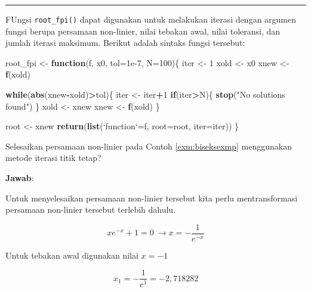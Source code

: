 \documentclass[]{book}
\newenvironment{Shaded}{\begin{snugshade}}{\end{snugshade}}
\newcommand{\ControlFlowTok}[1]{\textcolor[rgb]{0.13,0.29,0.53}{\textbf{#1}}}
\newcommand{\DataTypeTok}[1]{\textcolor[rgb]{0.13,0.29,0.53}{#1}}
\newcommand{\DecValTok}[1]{\textcolor[rgb]{0.00,0.00,0.81}{#1}}
\newcommand{\FloatTok}[1]{\textcolor[rgb]{0.00,0.00,0.81}{#1}}
\newcommand{\KeywordTok}[1]{\textcolor[rgb]{0.13,0.29,0.53}{\textbf{#1}}}
\newcommand{\NormalTok}[1]{#1}
\newcommand{\OperatorTok}[1]{\textcolor[rgb]{0.81,0.36,0.00}{\textbf{#1}}}
\newcommand{\StringTok}[1]{\textcolor[rgb]{0.31,0.60,0.02}{#1}}
\theoremstyle{definition}
\theoremstyle{definition}
\theoremstyle{definition}
\theoremstyle{remark}
\let\BeginKnitrBlock\begin \let\EndKnitrBlock\end
\begin{document}
\begin{center}\rule{0.5\linewidth}{\linethickness}\end{center}

FUngsi \texttt{root\_fpi()} dapat digunakan untuk melakukan iterasi dengan argumen fungsi berupa persamaan non-linier, nilai tebakan awal, nilai toleransi, dan jumlah iterasi maksimum. Berikut adalah sintaks fungsi tersebut:

\begin{Shaded}
\begin{Highlighting}[]
\NormalTok{root_fpi <-}\StringTok{ }\ControlFlowTok{function}\NormalTok{(f, x0, }\DataTypeTok{tol=}\FloatTok{1e-7}\NormalTok{, }\DataTypeTok{N=}\DecValTok{100}\NormalTok{)\{}
\NormalTok{  iter <-}\StringTok{ }\DecValTok{1}
\NormalTok{  xold <-}\StringTok{ }\NormalTok{x0}
\NormalTok{  xnew <-}\StringTok{ }\KeywordTok{f}\NormalTok{(xold)}
  
  \ControlFlowTok{while}\NormalTok{(}\KeywordTok{abs}\NormalTok{(xnew}\OperatorTok{-}\NormalTok{xold)}\OperatorTok{>}\NormalTok{tol)\{}
\NormalTok{    iter <-}\StringTok{ }\NormalTok{iter}\OperatorTok{+}\DecValTok{1}
    \ControlFlowTok{if}\NormalTok{(iter}\OperatorTok{>}\NormalTok{N)\{}
      \KeywordTok{stop}\NormalTok{(}\StringTok{"No solutions found"}\NormalTok{)}
\NormalTok{    \}}
\NormalTok{    xold <-}\StringTok{ }\NormalTok{xnew}
\NormalTok{    xnew <-}\StringTok{ }\KeywordTok{f}\NormalTok{(xold)}
\NormalTok{  \}}
  
\NormalTok{  root <-}\StringTok{ }\NormalTok{xnew}
  \KeywordTok{return}\NormalTok{(}\KeywordTok{list}\NormalTok{(}\StringTok{`}\DataTypeTok{function}\StringTok{`}\NormalTok{=f, }\DataTypeTok{root=}\NormalTok{root, }\DataTypeTok{iter=}\NormalTok{iter))}
\NormalTok{\}}
\end{Highlighting}
\end{Shaded}

\BeginKnitrBlock{example}
\protect\hypertarget{exm:fixexmp}{}{\label{exm:fixexmp} }Selesaikan persamaan non-linier pada Contoh \ref{exm:biseksexmp} menggunakan metode iterasi titik tetap?
\EndKnitrBlock{example}

\textbf{Jawab}:

Untuk menyelesaikan persamaan non-linier tersebut kita perlu mentransformasi persamaan non-linier tersebut terlebih dahulu.

\[
xe^{-x}+1=0\ \to x=-\frac{1}{e^{-x}}
\]

Untuk tebakan awal digunakan nilai \(x=-1\)

\[
x_1 = -\frac{1}{e^{1}}=-2,718282
\]
\end{document}
